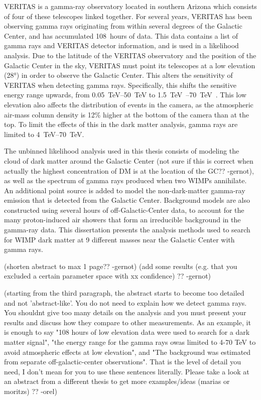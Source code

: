 VERITAS is a gamma-ray observatory located in southern Arizona which consists of four of these telescopes linked together.
For several years, VERITAS has been observing gamma rays originating from within several degrees of the Galactic Center, and has accumulated \SI{108}{hours} of data.
This data contains a list of gamma rays and VERITAS detector information, and is used in a likelihood analysis.
Due to the latitude of the VERITAS observatory and the position of the Galactic Center in the sky, VERITAS must point its telescopes at a low elevation (\nicetilde\ang{28}) in order to observe the Galactic Center.
This alters the sensitivity of VERITAS when detecting gamma rays.
Specifically, this shifts the sensitive energy range upwards, from \SIrange{0.05}{50}{\TeV} to \SIrange{1.5}{70}{\TeV{}}.
This low elevation also affects the distribution of events in the camera, as the atmospheric air-mass column density is 12\% higher at the bottom of the camera than at the top.
To limit the effects of this in the dark matter analysis, gamma rays are limited to \SIrange{4}{70}{\TeV}.

The unbinned likelihood analysis used in this thesis consists of modeling the {\color{red}cloud of dark matter around the Galactic Center (not sure if this is correct when actually the highest concentration of DM is at the location of the GC?? -gernot)}, as well as the spectrum of gamma rays produced when two WIMPs annihilate.
An additional point source is added to model the non-dark-matter gamma-ray emission that is detected from the Galactic Center.
Background models are also constructed using several hours of off-Galactic-Center data, to account for the many proton-induced air showers that form an irreducible background in the gamma-ray data.
This dissertation presents the analysis methods used to search for WIMP dark matter at 9 different masses near the Galactic Center with \TeV{} gamma rays.

{\color{red}(shorten abstract to max 1 page?? -gernot)}
{\color{red}(add some results (e.g. that you excluded a certain parameter space with xx confidence) ?? -gernot)}

{\color{red}(starting from the third paragraph, the abstract starts to become too detailed and not 'abstract-like'.
You do not need to explain how we detect gamma rays.  
You shouldnt give too many details on the analysis and you must present your results and discuss how they compare to other measurements.
As an example, it is enough to say "108 hours of low elevation data were used to search for a dark matter signal", "the energy range for the gamma rays owas limited to 4-70 TeV to avoid atmospheric effects at low elevation", and "The background was estimated from separate off-galactic-center observations".
That is the level of detail you need, I don't mean for you to use these sentences literally.
Please take a look at an abstract from a different thesis to get more examples/ideas (marias or moritzs) ?? -orel)}



\cleartoevenpage[\thispagestyle{plain}]
\null

